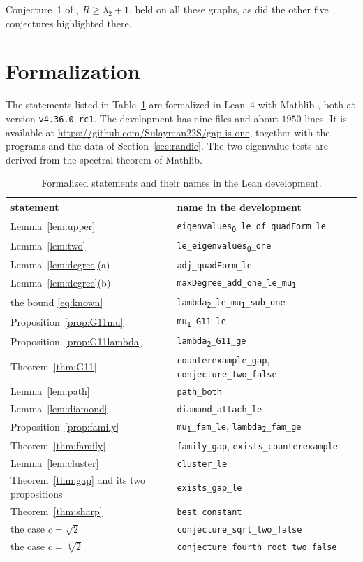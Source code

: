 \documentclass[11pt]{amsart}
\theoremstyle{definition}
\theoremstyle{remark}
\newcommand{\lean}[1]{\texttt{#1}}
\begin{document}
Conjecture~1 of \cite{Cazenave}, $R\ge\lambda_2+1$, held on all these graphs, as did the other
five conjectures highlighted there.

\section{Formalization}\label{sec:lean}

The statements listed in Table~\ref{tab:lean} are formalized in Lean~4 \cite{Lean4} with
Mathlib \cite{Mathlib}, both at version \texttt{v4.36.0-rc1}. The development has nine files
and about $1950$ lines. It is available at
\url{https://github.com/Sulayman22S/gap-is-one}, together with the programs and the data of
Section~\ref{sec:randic}. The two eigenvalue tests are derived from the spectral theorem of
Mathlib.

\begin{table}[ht]
\centering
\footnotesize
\begin{tabular}{@{}ll@{}}
\toprule
statement & name in the development\\
\midrule
Lemma~\ref{lem:upper} & \lean{eigenvalues\textsubscript{0}\_le\_of\_quadForm\_le}\\
Lemma~\ref{lem:two} & \lean{le\_eigenvalues\textsubscript{0}\_one}\\
Lemma~\ref{lem:degree}(a) & \lean{adj\_quadForm\_le}\\
Lemma~\ref{lem:degree}(b) & \lean{maxDegree\_add\_one\_le\_mu\textsubscript{1}}\\
the bound \eqref{eq:known} & \lean{lambda\textsubscript{2}\_le\_mu\textsubscript{1}\_sub\_one}\\
Proposition~\ref{prop:G11mu} & \lean{mu\textsubscript{1}\_G11\_le}\\
Proposition~\ref{prop:G11lambda} & \lean{lambda\textsubscript{2}\_G11\_ge}\\
Theorem~\ref{thm:G11} & \lean{counterexample\_gap}, \lean{conjecture\_two\_false}\\
Lemma~\ref{lem:path} & \lean{path\_both}\\
Lemma~\ref{lem:diamond} & \lean{diamond\_attach\_le}\\
Proposition~\ref{prop:family} & \lean{mu\textsubscript{1}\_fam\_le}, \lean{lambda\textsubscript{2}\_fam\_ge}\\
Theorem~\ref{thm:family} & \lean{family\_gap}, \lean{exists\_counterexample}\\
Lemma~\ref{lem:cluster} & \lean{cluster\_le}\\
Theorem~\ref{thm:gap} and its two propositions & \lean{exists\_gap\_le}\\
Theorem~\ref{thm:sharp} & \lean{best\_constant}\\
the case $c=\sqrt2$ & \lean{conjecture\_sqrt\_two\_false}\\
the case $c=\sqrt[4]{2}$ & \lean{conjecture\_fourth\_root\_two\_false}\\
\bottomrule
\end{tabular}
\smallskip
\caption{Formalized statements and their names in the Lean development.}\label{tab:lean}
\end{table}
\end{document}
